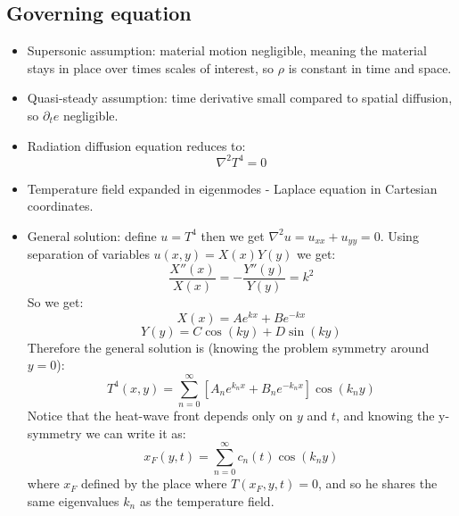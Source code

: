 \documentclass{article}
\begin{document}
\subsection*{Governing equation}
\begin{itemize}
    \item Supersonic assumption: material motion negligible, meaning the material stays in place over times scales of interest, so $\rho$ is constant in time and space.
    \item Quasi-steady assumption: time derivative small compared to spatial diffusion, so $\partial_t e$ negligible.
    \item Radiation diffusion equation reduces to:
    \[
    \nabla^2 T^4 = 0
    \]
    \item Temperature field expanded in eigenmodes - Laplace equation in Cartesian coordinates.
    \item General solution:
    define $u = T^4$ then we get $\nabla^2 u = u_{xx}+u_{yy}=0$. Using separation of variables $u(x,y) = X(x)Y(y)$ we get:
    \[\frac{X''(x)}{X(x)} = -\frac{Y''(y)}{Y(y)} = k^2\]
    So we get:
    \[X(x) = A e^{kx} + B e^{-kx}\]
    \[Y(y) = C \cos(ky) + D \sin(ky)\]
    Therefore the general solution is (knowing the problem symmetry around $y=0$):
    \begin{equation}
    T^4(x,y) = \sum_{n=0}^\infty \left[A_n e^{k_n x} + B_n e^{-k_n x}\right] \cos(k_n y)
    \end{equation}
    Notice that the heat-wave front depends only on $y$ and $t$, and knowing the y-symmetry we can write it as:
    \begin{equation}
    x_F(y,t) = \sum_{n=0}^\infty c_n(t) \cos(k_n y)
    \end{equation}
    where $x_F$ defined by the place where $T(x_F,y,t) = 0$, and so he shares the same eigenvalues $k_n$ as the temperature field.
\end{itemize}
\end{document}
